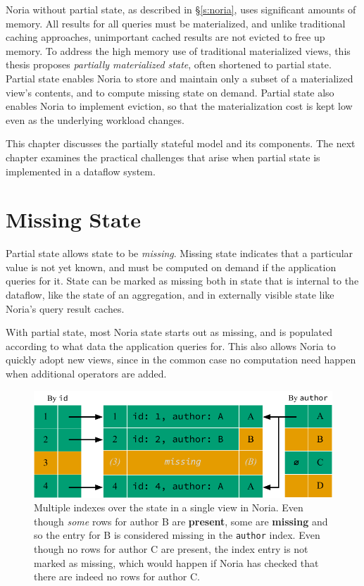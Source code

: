 Noria without partial state, as described in \S\ref{s:noria}, uses significant
amounts of memory. All results for all queries must be materialized, and unlike
traditional caching approaches, unimportant cached results are not evicted to
free up memory. To address the high memory use of traditional materialized
views, this thesis proposes \textit{partially materialized state}, often
shortened to partial state. Partial state enables Noria to store and maintain
only a subset of a materialized view's contents, and to compute missing state on
demand. Partial state also enables Noria to implement eviction, so that the
materialization cost is kept low even as the underlying workload changes.

This chapter discusses the partially stateful model and its components. The next
chapter examines the practical challenges that arise when partial state is
implemented in a dataflow system.

\section{Missing State}
\label{s:missing}

Partial state allows state to be \textit{missing}. Missing state indicates that
a particular value is not yet known, and must be computed on demand if the
application queries for it. State can be marked as missing both in state that is
internal to the dataflow, like the state of an aggregation, and in externally
visible state like Noria's query result caches.

With partial state, most Noria state starts out as missing, and is populated
according to what data the application queries for. This also allows Noria to
quickly adopt new views, since in the common case no computation need happen
when additional operators are added.

\begin{figure}
  \centering
  \includegraphics{diagrams/Indexing.pdf}
  \caption{Multiple indexes over the state in a single view in Noria. Even
  though \emph{some} rows for author B are \textbf{\color{set3}present}, some
  are \textbf{\color{set2}missing} and so the entry for B is considered missing
  in the \texttt{author} index. Even though no rows for author C are present,
  the index entry is not marked as missing, which would happen if Noria has
  checked that there are indeed no rows for author C.}
  \label{f:indexing}
\end{figure}

